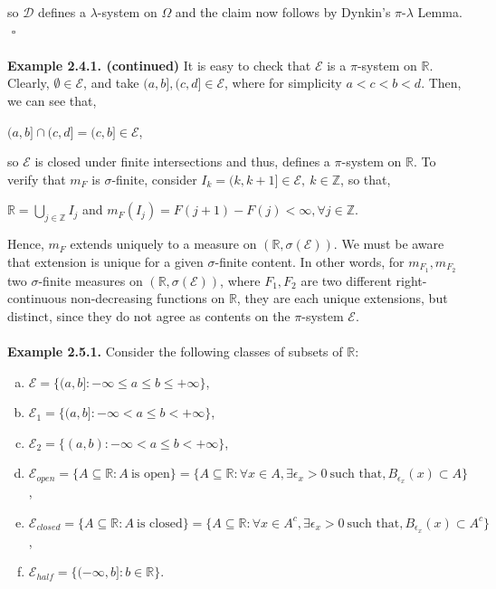 \documentclass{article}
\begin{document}
so $\mathcal{D}$ defines a $\lambda$-system on $\Omega$ and the claim now follows by Dynkin's $\pi$-$\lambda$ Lemma. \\ ${}$ \hfill $\square$ \\\\
\textbf{Example 2.4.1. (continued)} It is easy to check that $\mathcal{E}$ is a $\pi$-system on $\mathbb{R}$. Clearly, $\emptyset \in \mathcal{E}$, and take $(a,b], (c,d] \in \mathcal{E}$, where for simplicity $a < c < b < d$. Then, we can see that,
\begin{center}
	$(a,b] \cap (c,d] = (c,b] \in \mathcal{E}$,
\end{center}
so $\mathcal{E}$ is closed under finite intersections and thus, defines a $\pi$-system on $\mathbb{R}$. To verify that $m_F$ is $\sigma$-finite, consider $I_k = (k, k+1] \in \mathcal{E}, \ k \in \mathbb{Z}$, so that,
\begin{center}
	$\mathbb{R} = \bigcup_{j \in \mathbb{Z}}I_j$ and $m_F(I_j) = F(j+1) - F(j) < \infty, \forall j \in \mathbb{Z}$.
\end{center}
Hence, $m_F$ extends uniquely to a measure on $(\mathbb{R}, \sigma(\mathcal{E}))$. We must be aware that extension is unique for a given $\sigma$-finite content. In other words, for $m_{F_1}, m_{F_2}$ two $\sigma$-finite measures on $(\mathbb{R}, \sigma(\mathcal{E}))$, where $F_1, F_2$ are two different right-continuous non-decreasing functions on $\mathbb{R}$, they are each unique extensions, but distinct, since they do not agree as contents on the $\pi$-system $\mathcal{E}$.\\\\
\textbf{Example 2.5.1.} Consider the following classes of subsets of $\mathbb{R}$:
\begin{enumerate}[(a)]
	\item $\mathcal{E} = \{(a,b]: -\infty \leq a \leq b \leq +\infty\}$,
	\item $\mathcal{E}_1 = \{(a,b]: -\infty < a \leq b < +\infty\}$,
	\item $\mathcal{E}_2 = \{(a,b): -\infty < a \leq b < +\infty\}$,
	\item $\mathcal{E}_{open} = \{A \subseteq \mathbb{R}: A \ \text{is open}\} = \{A \subseteq \mathbb{R}: \forall x \in A, \exists \epsilon_x >0 \ \text{such that}, B_{\epsilon_x}(x) \subset A\}$,
	\item $\mathcal{E}_{closed} = \{A \subseteq \mathbb{R}: A \ \text{is closed}\} = \{A \subseteq \mathbb{R}: \forall x \in A^c, \exists \epsilon_x >0 \ \text{such that}, B_{\epsilon_x}(x) \subset A^c\}$,
	\item $\mathcal{E}_{half} = \{(-\infty, b]: b \in \mathbb{R}\}$.
\end{enumerate}
\end{document}
